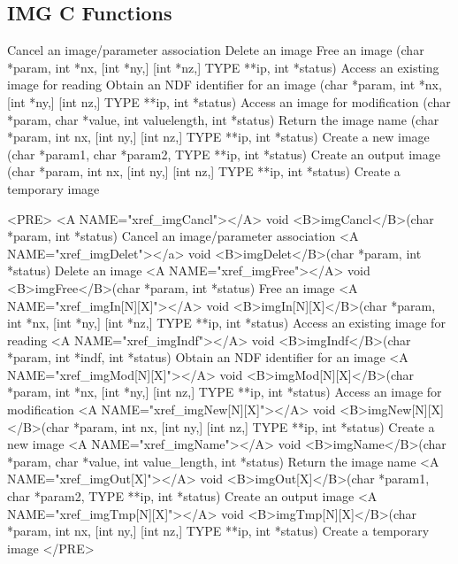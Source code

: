 \documentclass[twoside,11pt]{article}
\newenvironment{latexonly}{}{}
\renewcommand{\_}{\texttt{\symbol{95}}}
\begin{document}
\subsection{IMG C Functions}
\begin{latexonly}
{\small
\begin{description}
     {Cancel an image/parameter association}
     {Delete an image}
     {Free an image}
     {(char *param, int *nx, [int *ny,] [int *nz,] TYPE **ip, int *status)}
     {Access an existing image for reading}
     {Obtain an NDF identifier for an image}
     {(char *param, int *nx, [int *ny,] [int nz,] TYPE **ip, int *status)}
     {Access an image for modification}
     {(char *param, char *value, int value\_length, int *status)}
     {Return the image name}
     {(char *param, int nx, [int ny,] [int nz,] TYPE **ip, int *status)}
     {Create a new image}
     {(char *param1, char *param2, TYPE **ip, int *status)}
     {Create an output image}
     {(char *param, int nx, [int ny,] [int nz,] TYPE **ip, int *status)}
     {Create a temporary image}
\end{description}
}
\end{latexonly}
\begin{rawhtml}
<PRE>
<A NAME="xref_imgCancl"></A>
  void <B>imgCancl</B>(char *param, int *status) 
     Cancel an image/parameter association 
<A NAME="xref_imgDelet"></a>
  void <B>imgDelet</B>(char *param, int *status) 
     Delete an image 
<A NAME="xref_imgFree"></A>
  void <B>imgFree</B>(char *param, int *status) 
     Free an image 
<A NAME="xref_imgIn[N][X]"></A>
  void <B>imgIn[N][X]</B>(char *param, int *nx, [int *ny,] [int *nz,] TYPE **ip, int *status) 
     Access an existing image for reading 
<A NAME="xref_imgIndf"></A>
  void <B>imgIndf</B>(char *param, int *indf, int *status) 
     Obtain an NDF identifier for an image 
<A NAME="xref_imgMod[N][X]"></A>
  void <B>imgMod[N][X]</B>(char *param, int *nx, [int *ny,] [int nz,] TYPE **ip, int *status) 
     Access an image for modification 
<A NAME="xref_imgNew[N][X]"></A>
  void <B>imgNew[N][X]</B>(char *param, int nx, [int ny,] [int nz,] TYPE **ip, int *status) 
     Create a new image 
<A NAME="xref_imgName"></A>
  void <B>imgName</B>(char *param, char *value, int value_length, int *status) 
     Return the image name
<A NAME="xref_imgOut[X]"></A>
  void <B>imgOut[X]</B>(char *param1, char *param2, TYPE **ip, int *status) 
     Create an output image 
<A NAME="xref_imgTmp[N][X]"></A>
  void <B>imgTmp[N][X]</B>(char *param, int nx, [int ny,] [int nz,] TYPE **ip, int *status) 
     Create a temporary image 
</PRE>
\end{rawhtml}
\end{document}
